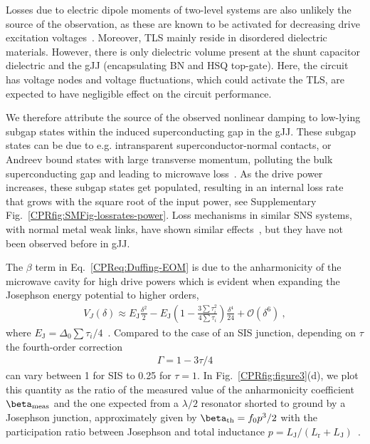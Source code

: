 Losses due to electric dipole moments of two-level systems are also unlikely the source of the observation, as these are known to be activated for decreasing drive excitation voltages~\cite{martinisDecoherenceJosephsonQubits2005c,oconnellMicrowaveDielectricLoss2008a,gunnarssonDielectricLossesMultilayer2013}.
%
Moreover, TLS mainly reside in disordered dielectric materials.
%
However, there is only dielectric volume present at the shunt capacitor dielectric and the gJJ (encapsulating BN and HSQ top-gate).
%
Here, the circuit has voltage nodes and voltage fluctuations, which could activate the TLS, are expected to have negligible effect on the circuit performance.

We therefore attribute the source of the observed nonlinear damping to low-lying subgap states within the induced superconducting gap in the gJJ.
%
These subgap states can be due to e.g. intransparent superconductor-normal contacts, or Andreev bound states with large transverse momentum, polluting the bulk superconducting gap and leading to microwave loss~\cite{schmidtBallisticGrapheneSuperconducting2018}.
%
As the drive power increases, these subgap states get populated, resulting in an internal loss rate that grows with the square root of the input power, see Supplementary Fig.~\ref{CPRfig:SMFig-lossrates-power}.
%
Loss mechanisms in similar SNS systems, with normal metal weak links, have shown similar effects~\cite{fuechsleEffectMicrowavesCurrentPhase2009,dassonnevilleDissipationSupercurrentFluctuations2013}, but they have not been observed before in gJJ.

The $\beta$ term in Eq.~\ref{CPReq:Duffing-EOM} is due to the anharmonicity of the microwave cavity for high drive powers which is evident when expanding the Josephson energy potential to higher orders,
\begin{align}
V_J(\delta) \approx E_\text{J} \frac{\delta^2}{2} - E_\text{J}\left( 1-\frac{3\sum\tau_i^2}{4\sum\tau_i} \right) \frac{\delta^4}{24} +\mathcal{O}(\delta^6)\ , 
\label{CPReq:EJtaylor}
\end{align}
%
where $E_\text{J}=\Delta_0\sum\tau_i/4$~\cite{kringhojAnharmonicitySuperconductingQubit2018}.
%
Compared to the case of an SIS junction, depending on $\tau$ the fourth-order correction 
%
\begin{align}
\Gamma = 1-3\tau/4
\label{CPReq:Ejcorrection}
\end{align} 
%
can vary between 1 for SIS to 0.25 for $\tau=1$.
%
In Fig.~\ref{CPRfig:figure3}(d), we plot this quantity as the ratio of the measured value of the anharmonicity coefficient $\beta_{\rm meas}$ and the one expected from a $\lambda/2$ resonator shorted to ground by a Josephson junction, approximately given by $\beta_{\rm th}=f_0p^3/2$ with the participation ratio between Josephson and total inductance $p=L_\text{J}/(L_\text{r}+L_\text{J})$~\cite{wilsonPhotonGenerationElectromagnetic2010b,zhouHighgainWeaklyNonlinear2014}.


